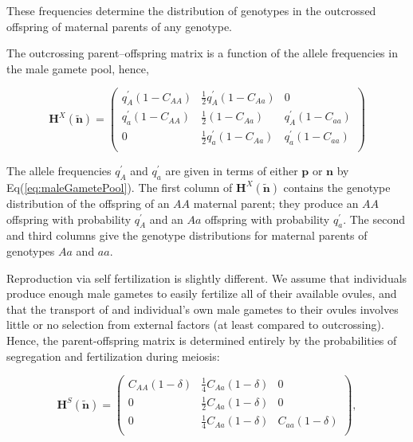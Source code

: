 \documentclass[11pt]{article}
\def\mbf#1{\mathbf{#1}}
\begin{document}
\noindent These frequencies determine the distribution of genotypes in the outcrossed offspring of maternal parents of any genotype.

The outcrossing parent–offspring matrix is a function of the allele frequencies in the male gamete pool, hence,

\begin{equation} \label{eq:HX}
	\mbf{H}^X(\tilde{\mbf{n}}) = 
			\left(
			\begin{array}{ccc}
				q^{\prime}_{A} (1 - C_{AA}) & \frac{1}{2} q^{\prime}_{A} (1 - C_{Aa}) & 0 \\
				q^{\prime}_{a} (1 - C_{AA}) & \frac{1}{2} (1 - C_{Aa}) & q^{\prime}_{A}  (1 - C_{aa}) \\
				0 & \frac{1}{2} q^{\prime}_{a} (1 - C_{Aa}) & q^{\prime}_{a} (1 - C_{aa}) \\
			\end{array} \right)
\end{equation}

\noindent The allele frequencies $q^{\prime}_A$ and $q^{\prime}_a$ are given in terms of either $\mbf{p}$ or $\mbf{n}$ by Eq(\ref{eq:maleGametePool}). The first column of $\mbf{H}^X(\tilde{\mbf{n}})$ contains the genotype distribution of the offspring of an $AA$ maternal parent; they produce an $AA$ offspring with probability $q^{\prime}_A$ and an $Aa$ offspring with probability $q^{\prime}_a$. The second and third columns give the genotype distributions for maternal parents of genotypes $Aa$ and $aa$.

Reproduction via self fertilization is slightly different. We assume that individuals produce enough male gametes to easily fertilize all of their available ovules, and that the transport of and individual's own male gametes to their ovules involves little or no selection from external factors (at least compared to outcrossing). Hence, the parent-offspring matrix is determined entirely by the probabilities of segregation and fertilization during meiosis: 

\begin{equation} \label{eq:HS}
	\mbf{H}^S(\tilde{\mbf{n}}) = 
			\left(
			\begin{array}{ccc}
				C_{AA}(1 - \delta) & \frac{1}{4} C_{Aa}(1 - \delta) & 0 \\
				0      & \frac{1}{2} C_{Aa}(1 - \delta) & 0 \\
				0 & \frac{1}{4} C_{Aa}(1 - \delta) & C_{aa}(1 - \delta) \\
			\end{array} \right),
\end{equation}
\end{document}
